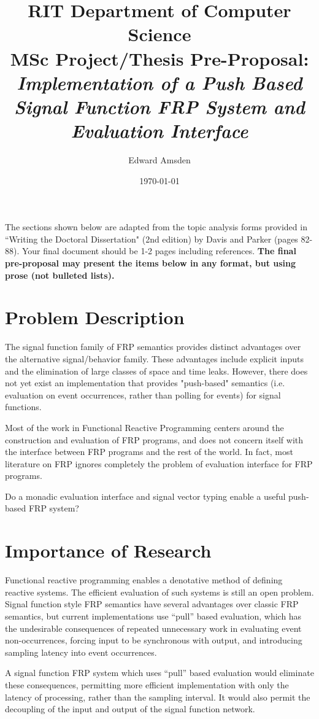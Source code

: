 \documentclass[11pt]{artikel3}
\title{RIT Department of Computer Science\\MSc Project/Thesis Pre-Proposal:\\\emph{Implementation of a Push Based Signal Function FRP System and Evaluation Interface}}
\author{Edward Amsden}
\date{\today}
\begin{document}
\maketitle

The sections shown below are adapted from the topic analysis forms provided in ``Writing the Doctoral Dissertation" (2nd edition) by Davis and Parker (pages 82-88). Your final document should be 1-2 pages including references. {\bf The final pre-proposal may present the items below in any format, but using prose (not bulleted lists).} 

\section{Problem Description}
The signal function family of FRP semantics provides distinct advantages over the alternative signal/behavior family. These advantages include explicit inputs and the elimination of large classes of space and time leaks. However, there does not yet exist an implementation that provides "push-based" semantics (i.e. evaluation on event occurrences, rather than polling for events) for signal functions. 

Most of the work in Functional Reactive Programming centers around the construction and evaluation of FRP programs, and does not concern itself with the interface between FRP programs and the rest of the world. In fact, most literature on FRP ignores completely the problem of evaluation interface for FRP programs. 

Do a monadic evaluation interface and signal vector typing enable a useful push-based FRP system? 

\section{Importance of Research}
Functional reactive programming enables a denotative method of defining reactive systems. The efficient evaluation
of such systems is still an open problem. Signal function style FRP semantics have several advantages over
classic FRP semantics, but current implementations use ``pull'' based evaluation, which has the undesirable consequences of
repeated unnecessary work in evaluating event non-occurrences, forcing input to be synchronous with output, and introducing sampling latency into event occurrences.

A signal function FRP system which uses ``pull'' based evaluation would eliminate these consequences, permitting more
efficient implementation with only the latency of processing, rather than the sampling interval. It would also permit
the decoupling of the input and output of the signal function network.
\end{document}

